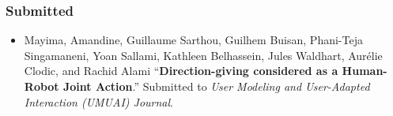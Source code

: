 \subsubsection*{Submitted}

\begin{itemize}
\item Mayima, Amandine, Guillaume Sarthou, Guilhem Buisan, Phani-Teja Singamaneni, Yoan Sallami, Kathleen Belhassein, Jules Waldhart, Aurélie Clodic, and Rachid Alami ``\textbf{Direction-giving considered as a Human-Robot Joint Action}.'' Submitted to \textit{User Modeling and User-Adapted Interaction (UMUAI) Journal}.
\end{itemize}